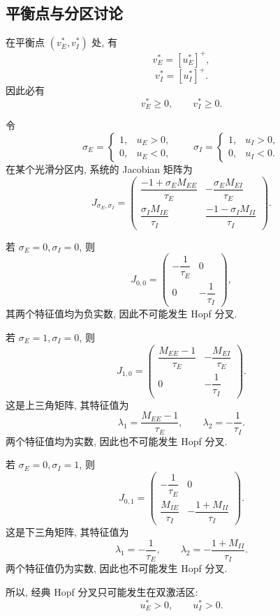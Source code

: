 ﻿\documentclass[UTF8,  zihao=-4]{ctexart}
\begin{document}
\subsection{平衡点与分区讨论}

在平衡点 \((v_E^*,  v_I^*)\) 处,  有
\[
v_E^*=[u_E^*]^+,  
\]
\[
v_I^*=[u_I^*]^+.
\]
因此必有
\[
v_E^*\ge 0,  \qquad v_I^*\ge 0.
\]

令
\[
\sigma_E=
\begin{cases}
1,   & u_E>0,  \\
0,   & u_E<0,  
\end{cases}
\qquad
\sigma_I=
\begin{cases}
1,   & u_I>0,  \\
0,   & u_I<0.
\end{cases}
\]
在某个光滑分区内,  系统的 Jacobian 矩阵为
\[
J_{\sigma_E,  \sigma_I}
=
\begin{pmatrix}
\dfrac{-1+\sigma_E M_{EE}}{\tau_E}
&
-\dfrac{\sigma_E M_{EI}}{\tau_E}
\\[1.2em]
\dfrac{\sigma_I M_{IE}}{\tau_I}
&
\dfrac{-1-\sigma_I M_{II}}{\tau_I}
\end{pmatrix}.
\]

若 \(\sigma_E=0,  \sigma_I=0\),  则
\[
J_{0,  0}
=
\begin{pmatrix}
-\dfrac1{\tau_E} & 0\\
0 & -\dfrac1{\tau_I}
\end{pmatrix},  
\]
其两个特征值均为负实数,  因此不可能发生 Hopf 分叉.

若 \(\sigma_E=1,  \sigma_I=0\),  则
\[
J_{1,  0}
=
\begin{pmatrix}
\dfrac{M_{EE}-1}{\tau_E} & -\dfrac{M_{EI}}{\tau_E}\\
0 & -\dfrac1{\tau_I}
\end{pmatrix}.
\]
这是上三角矩阵,  其特征值为
\[
\lambda_1=\frac{M_{EE}-1}{\tau_E},  
\qquad
\lambda_2=-\frac1{\tau_I}.
\]
两个特征值均为实数,  因此也不可能发生 Hopf 分叉.

若 \(\sigma_E=0,  \sigma_I=1\),  则
\[
J_{0,  1}
=
\begin{pmatrix}
-\dfrac1{\tau_E} & 0\\
\dfrac{M_{IE}}{\tau_I} & -\dfrac{1+M_{II}}{\tau_I}
\end{pmatrix}.
\]
这是下三角矩阵,  其特征值为
\[
\lambda_1=-\frac1{\tau_E},  
\qquad
\lambda_2=-\frac{1+M_{II}}{\tau_I}.
\]
两个特征值仍为实数,  因此也不可能发生 Hopf 分叉.

所以,  经典 Hopf 分叉只可能发生在双激活区:
\[
u_E^*>0,  \qquad u_I^*>0.
\]
\end{document}
